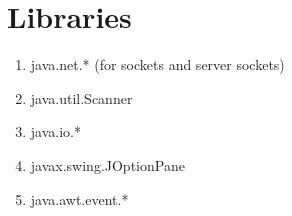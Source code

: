 \documentclass{article}
\begin{document}
\section{Libraries}
\begin{enumerate}
	\item java.net.* (for sockets and server sockets)
	\item java.util.Scanner
	\item java.io.*
	\item javax.swing.JOptionPane
	\item java.awt.event.*
\end{enumerate}
\end{document}
